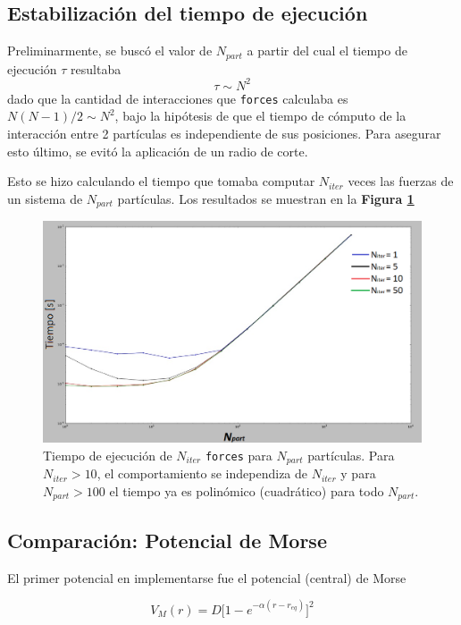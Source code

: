 \documentclass[twoside, 12pt]{article}
\begin{document}
\subsection{Estabilización del tiempo de ejecución}

Preliminarmente, se buscó el valor de $N_{part}$ a partir del cual el tiempo de ejecución $\tau$ resultaba \[\tau\sim N^2\] dado que la cantidad de interacciones que \texttt{forces} calculaba es $N(N-1)/2\sim N^2$, bajo la hipótesis de que el tiempo de cómputo de la interacción entre 2 partículas es independiente de sus posiciones. Para asegurar esto último, se evitó la aplicación de un radio de corte.

Esto se hizo calculando el tiempo que tomaba computar $N_{iter}$ veces las fuerzas de un sistema de $N_{part}$ partículas. Los resultados se muestran en la \textbf{Figura \ref{fig:TvsNpart}}

\begin{figure}[h]
	\centering
	\includegraphics[scale=0.6]{Imagenes/Estabilizacion_Npart.png}
	\caption{Tiempo de ejecución de $N_{iter}$ \texttt{forces} para $N_{part}$ partículas. Para $N_{iter}>10$, el comportamiento se independiza de $N_{iter}$ y para $N_{part}>100$ el tiempo ya es polinómico (cuadrático) para todo $N_{part}$.}
	\label{fig:TvsNpart}
\end{figure}

\subsection{Comparación: Potencial de Morse}

El primer potencial en implementarse fue el potencial (central) de Morse

\[ V_{M} (r) = D\big[1-e^{-\alpha (r-r_{eq})}\big]^2\]
\end{document}

